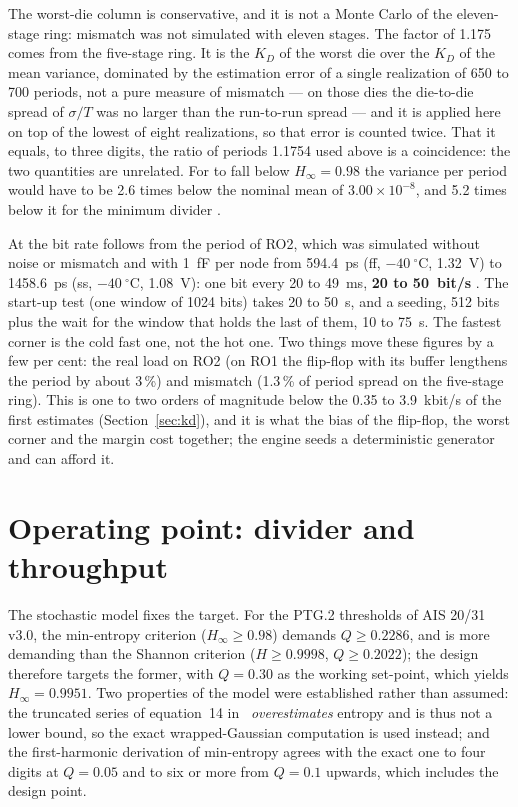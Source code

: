 The worst-die column is conservative, and it is not a Monte Carlo of the
eleven-stage ring: mismatch was not simulated with eleven stages. The
factor of 1.175 comes from the five-stage ring. It is the $K_D$ of the
worst die over the $K_D$ of the mean variance, dominated by the
estimation error of a single realization of 650 to 700
periods, not a pure measure of mismatch --- on those dies the die-to-die
spread of $\sigma/T$ was no larger than the run-to-run spread --- and it
is applied here on top of the lowest of eight realizations, so that error
is counted twice. That it equals, to three digits, the ratio of periods
1.1754 used above is a coincidence: the two quantities are unrelated. For  to fall below $H_\infty = 0.98$ the
variance per period would have to be 2.6 times below the nominal mean of
$3.00\times10^{-8}$, and 5.2 times below it for the minimum divider
 \est{}.

At  the bit rate follows from the period of RO2, which was
simulated without noise or mismatch and with 1~fF per node from 594.4~ps
(ff, $-40~^\circ$C, 1.32~V) to 1458.6~ps (ss, $-40~^\circ$C, 1.08~V): one
bit every 20 to 49~ms, \textbf{20 to 50~bit/s} \est{}. The start-up test
(one window of 1024 bits) takes 20 to 50~s, and a seeding, 512 bits plus
the wait for the window that holds the last of them, 10 to 75~s. The
fastest corner is the cold fast one, not the hot one. Two things move
these figures by a few per cent: the real load on RO2 (on RO1 the
flip-flop with its buffer lengthens the period by about 3\,\%) and
mismatch (1.3\,\% of period spread on the five-stage ring). This is one
to two orders of magnitude below the 0.35 to 3.9~kbit/s of the first
estimates (Section~\ref{sec:kd}), and it is
what the bias of the flip-flop, the worst corner and the margin cost
together; the engine seeds a deterministic generator and can afford it.

\section{Operating point: divider and throughput}
\label{sec:opoint}

The stochastic model fixes the target. For the PTG.2 thresholds of AIS
20/31 v3.0, the min-entropy criterion ($H_\infty \ge 0.98$) demands
$Q \ge 0.2286$, and is more demanding than the Shannon criterion
($H \ge 0.9998$, $Q \ge 0.2022$); the design therefore targets the former,
with $Q = 0.30$ as the working set-point, which yields
$H_\infty = 0.9951$. Two properties of the model were established rather
than assumed: the truncated series of equation~14
in~\cite{baudet_2011_security} \emph{overestimates} entropy and is thus
not a lower bound, so the exact wrapped-Gaussian computation is used
instead; and the first-harmonic derivation of min-entropy agrees with the
exact one to four digits at $Q = 0.05$ and to six or more from
$Q = 0.1$ upwards, which includes the design point.

